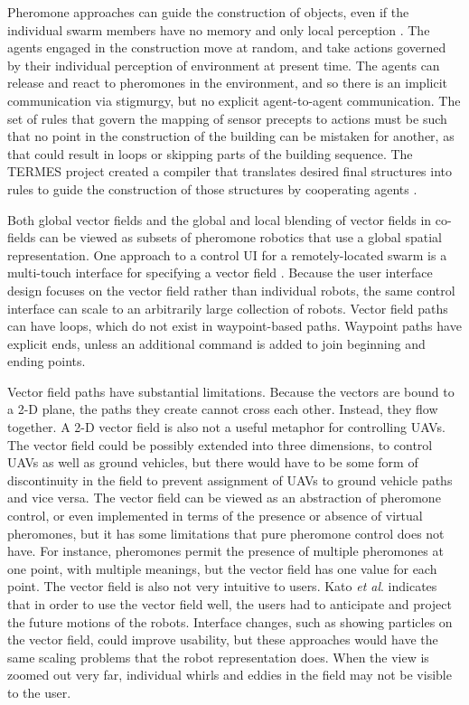 \documentclass[]{article}
\begin{document}
Pheromone approaches can guide the construction of objects, even if the individual swarm members have no memory and only local perception \cite{mason2003programming}. 
The agents engaged in the construction move at random, and take actions governed by their individual perception of environment at present time. 
The agents can release and react to pheromones in the environment, and so there is an implicit communication via stigmurgy, but no explicit agent-to-agent communication. 
The set of rules that govern the mapping of sensor precepts to actions must be such that no point in the construction of the building can be mistaken for another, as that could result in loops or skipping parts of the building sequence. 
The TERMES project created a compiler that translates desired final structures into rules to guide the construction of those structures by cooperating agents \cite{werfel2014designing}.

Both global vector fields and the global and local blending of vector fields in co-fields can be viewed as subsets of pheromone robotics that use a global spatial representation. 
One approach to a control UI for a remotely-located swarm is a multi-touch interface for specifying a vector field \cite{Kato:2009:MIC:1520340.1520500}.
Because the user interface design focuses on the vector field rather than individual robots, the same control interface can scale to an arbitrarily large collection of robots. 
Vector field paths can have loops, which do not exist in waypoint-based paths. 
Waypoint paths have explicit ends, unless an additional command is added to join beginning and ending points. 

Vector field paths have substantial limitations. 
Because the vectors are bound to a 2-D plane, the paths they create cannot cross each other. 
Instead, they flow together. 
A 2-D vector field is also not a useful metaphor for controlling UAVs.
The vector field could be possibly extended into three dimensions, to control UAVs as well as ground vehicles, but there would have to be some form of discontinuity in the field to prevent assignment of UAVs to ground vehicle paths and vice versa. 
The vector field can be viewed as an abstraction of pheromone control, or even implemented in terms of the presence or absence of virtual pheromones, but it has some limitations that pure pheromone control does not have.
For instance, pheromones permit the presence of multiple pheromones at one point, with multiple meanings, but the vector field has one value for each point. 
The vector field is also not very intuitive to users. 
Kato \emph{et al}. indicates that in order to use the vector field well, the users had to anticipate and project the future motions of the robots. 
Interface changes, such as showing particles on the vector field, could improve usability, but these approaches would have the same scaling problems that the robot representation does. 
When the view is zoomed out very far, individual whirls and eddies in the field may not be visible to the user. 
\end{document}
